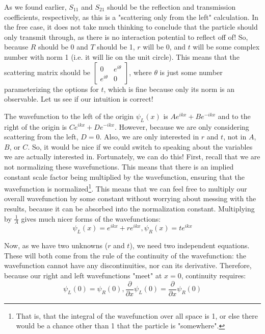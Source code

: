 \documentclass{report}
\begin{document}
As we found earlier, $S_{11}$ and $S_{21}$ should be the reflection and transmission coefficients, respectively, as this is a "scattering only from the left" calculation. In the free case, it does not take much thinking to conclude that the particle should only transmit through, as there is no interaction potential to reflect off of! So, because $R$ should be 0 and $T$ should be 1, $r$ will be 0, and $t$ will be some complex number with norm 1 (i.e. it will lie on the unit circle). This means that the scattering matrix should be $\begin{bmatrix} 0 & e^{i \theta} \\ e^{i \theta} & 0 \end{bmatrix}$, where $\theta$ is just some number parameterizing the options for $t$, which is fine because only its norm is an observable. Let us see if our intuition is correct!

The wavefunction to the left of the origin $\psi_L(x)$ is $Ae^{ikx} + Be^{-ikx}$ and to the right of the origin is $Ce^{ikx} + De^{-ikx}$. However, because we are only considering scattering from the left, $D=0$. Also, we are only interested in $r$ and $t$, not in $A$, $B$, or $C$. So, it would be nice if we could switch to speaking about the variables we are actually interested in. Fortunately, we can do this! First, recall that we are not normalizing these wavefunctions. This means that there is an implied constant scale factor being multiplied by the wavefunction, ensuring that the wavefunction is normalized\footnote{That is, that the integral of the wavefunction over all space is 1, or else there would be a chance other than 1 that the particle is "somewhere".}. This means that we can feel free to multiply our overall wavefunction by some constant without worrying about messing with the results, because it can be absorbed into the normalization constant. Multiplying by $\frac{1}{A}$ gives much nicer forms of the wavefunctions:
\[
\psi_L(x) = e^{ikx} + re^{ikx}, \psi_R(x) = te^{ikx}
\]

Now, as we have two unknowns ($r$ and $t$), we need two independent equations. These will both come from the rule of the continuity of the wavefunction: the wavefunction cannot have any discontinuities, nor can its derivative. Therefore, because our right and left wavefunctions "meet" at $x=0$, continuity requires:
\[
\psi_L(0) = \psi_R(0), \frac{\partial}{\partial x}\psi_L(0) = \frac{\partial}{\partial x}\psi_R(0)
\]
\end{document}
